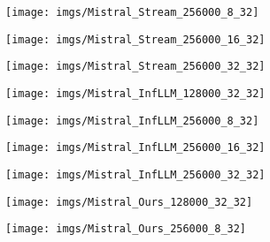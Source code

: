 \begin{figure*}[ht]
\begin{minipage}{\textwidth}
\begin{minipage}{0.24\textwidth}
		\end{minipage}%
		\begin{minipage}{0.24\textwidth}
			\centering
			\texttt{[image: imgs/Mistral\_Stream\_256000\_8\_32]} %
		\end{minipage}%
		\begin{minipage}{0.24\textwidth}
			\centering
			\texttt{[image: imgs/Mistral\_Stream\_256000\_16\_32]} %
		\end{minipage}%
		\begin{minipage}{0.24\textwidth}
			\centering
			\texttt{[image: imgs/Mistral\_Stream\_256000\_32\_32]} %
		\end{minipage}
	\end{minipage}
	\begin{minipage}{\textwidth}
		\centering
		\begin{minipage}{0.24\textwidth}
			\centering
			\texttt{[image: imgs/Mistral\_InfLLM\_128000\_32\_32]} %
		\end{minipage}%
		\begin{minipage}{0.24\textwidth}
			\centering
			\texttt{[image: imgs/Mistral\_InfLLM\_256000\_8\_32]} %
		\end{minipage}%
		\begin{minipage}{0.24\textwidth}
			\centering
			\texttt{[image: imgs/Mistral\_InfLLM\_256000\_16\_32]} %
		\end{minipage}%
		\begin{minipage}{0.24\textwidth}
			\centering
			\texttt{[image: imgs/Mistral\_InfLLM\_256000\_32\_32]} %
		\end{minipage}
	\end{minipage}
	\begin{minipage}{\textwidth}
		\centering
		\begin{minipage}{0.24\textwidth}
			\centering
			\texttt{[image: imgs/Mistral\_Ours\_128000\_32\_32]} %
		\end{minipage}%
		\begin{minipage}{0.24\textwidth}
			\centering
			\texttt{[image: imgs/Mistral\_Ours\_256000\_8\_32]} %

\end{minipage}
\end{minipage}
\end{figure*}
